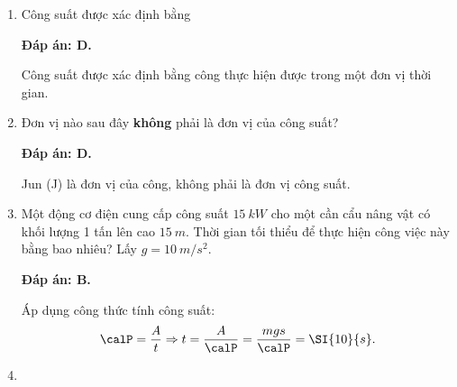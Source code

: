 \begin{enumerate}[label=\bfseries Câu \arabic*:]
	
	\item {}
	
	
	{
		Công suất được xác định bằng
	}
	
	\hideall
	{	
		\textbf{Đáp án: D.}
		
		Công suất được xác định bằng công thực hiện được trong một đơn vị thời gian.
	}
	\item {}
	
	
	{
		Đơn vị nào sau đây \textbf{không} phải là đơn vị của công suất?
	}
	
	\hideall
	{	
		\textbf{Đáp án: D.}
		
		Jun (J) là đơn vị của công, không phải là đơn vị công suất.
	}
	\item {}
	
	
	{
		Một động cơ điện cung cấp công suất $\SI{15}{kW}$ cho một cần cẩu nâng vật có khối lượng 1 tấn lên cao $\SI{15}{m}$. Thời gian tối thiểu để thực hiện công việc này bằng bao nhiêu? Lấy $g=\SI{10}{m/s^2}$.
	}
	
	\hideall
	{	
		\textbf{Đáp án: B.}
		
		Áp dụng công thức tính công suất:
		$$\calP = \dfrac{A}{t} \Rightarrow t = \dfrac{A}{\calP}  = \dfrac{mgs}{\calP} = \SI{10}{s}.$$
	}
	\item {}
	

\end{enumerate}
